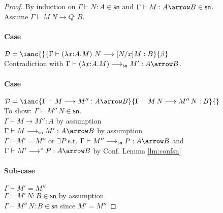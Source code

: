 \documentclass{article}
\newcommand{\csn}{\mathsf{sn}}
\newcommand{\mred}{\longrightarrow^*}
\newcommand{\red}{\longrightarrow}
\newcommand{\redsn}{\longrightarrow_\csn}
\begin{document}
\begin{proof}
By induction on $\Gamma \vdash N: A \in \csn$ and $\Gamma \vdash M : A \arrow B \in \csn$. \\[1em]
Assume $\Gamma \vdash M~N \red Q : B$.

\paragraph{Case} $\mathcal{D} = \ianc{}{\Gamma \vdash (\lambda x{:}A.M)~N \red [N/x]M : B}{\beta}$
\\[1em]
Contradiction with $\Gamma \vdash (\lambda x{:}A.M) \redsn M' : A \arrow B$.

\paragraph{Case} $\mathcal{D} = \ianc{\Gamma \vdash M \red M'' : A \arrow B}{\Gamma \vdash M\,N \red M''\,N: B}{}$
\\[1em]
To show: $\Gamma \vdash M''\,N \in \csn$.
\\[1em]
$\Gamma \vdash M \red M'' : A $ \hfill by assumption \\
$\Gamma \vdash M \redsn M' : A \arrow B$ \hfill by assumption \\
$\Gamma \vdash M' = M''$ or $\exists P$ s.t. $\Gamma \vdash M'' \redsn P : A \arrow B$ and $\Gamma \vdash M' \mred P: A \arrow B$ \hfill by Conf. Lemma \ref{lm:confsn}

\paragraph{Sub-case} $\Gamma \vdash M' = M''$
\\[1em]
$\Gamma \vdash M'\,N : B \in \csn$ \hfill by assumption \\
$\Gamma \vdash M''\,N : B \in \csn$ \hfill since $M' = M''$


\end{proof}
\end{document}
